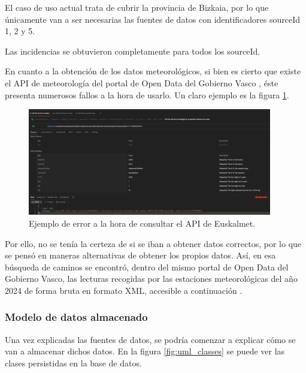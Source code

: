 El caso de uso actual trata de cubrir la provincia de Bizkaia, por lo que únicamente van a ser necesarias las fuentes de datos con identificadores sourceId 1, 2 y 5.

Las incidencias se obtuvieron completamente para todos los sourceId.

En cuanto a la obtención de los datos meteorológicos, si bien es cierto que existe el API de meteorología del portal de Open Data del Gobierno Vasco \cite{apiMeteo}, éste presenta numerosos fallos a la hora de usarlo. Un claro ejemplo es la figura \ref{fig:euskalmet_api_error}. 

\begin{figure}[H]
	\centering
	\includegraphics[width=0.95\textwidth]{includes/error_api_euskalmet.png}
	\caption{Ejemplo de error a la hora de consultar el API de Euskalmet.}
	\label{fig:euskalmet_api_error}
\end{figure}

Por ello, no se tenía la certeza de si se iban a obtener datos correctos, por lo que se pensó en maneras alternativas de obtener los propios datos. Así, en esa búsqueda de caminos se encontró, dentro del mismo portal de Open Data del Gobierno Vasco, las lecturas recogidas por las estaciones meteorológicas del año 2024 de forma bruta en formato XML, accesible a continuación \cite{xmlMeteo2024}. 

\subsubsection*{Modelo de datos almacenado}

Una vez explicadas las fuentes de datos, se podría comenzar a explicar cómo se van a almacenar dichos datos. En la figura \ref{fig:uml_classes} se puede ver las clases persistidas en la base de datos.

